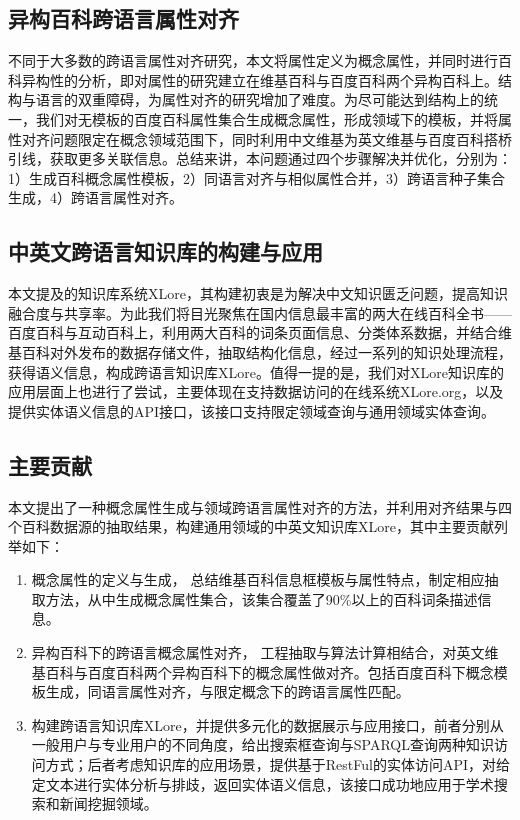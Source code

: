 
\subsection{异构百科跨语言属性对齐}
不同于大多数的跨语言属性对齐研究，本文将属性定义为概念属性，并同时进行百科异构性的分析，即对属性的研究建立在维基百科与百度百科两个异构百科上。结构与语言的双重障碍，为属性对齐的研究增加了难度。为尽可能达到结构上的统一，我们对无模板的百度百科属性集合生成概念属性，形成领域下的模板，并将属性对齐问题限定在概念领域范围下，同时利用中文维基为英文维基与百度百科搭桥引线，获取更多关联信息。总结来讲，本问题通过四个步骤解决并优化，分别为：1）生成百科概念属性模板，2）同语言对齐与相似属性合并，3）跨语言种子集合生成，4）跨语言属性对齐。


\subsection{中英文跨语言知识库的构建与应用}
本文提及的知识库系统XLore，其构建初衷是为解决中文知识匮乏问题，提高知识融合度与共享率。为此我们将目光聚焦在国内信息最丰富的两大在线百科全书——百度百科与互动百科上，利用两大百科的词条页面信息、分类体系数据，并结合维基百科对外发布的数据存储文件，抽取结构化信息，经过一系列的知识处理流程，获得语义信息，构成跨语言知识库XLore。值得一提的是，我们对XLore知识库的应用层面上也进行了尝试，主要体现在支持数据访问的在线系统XLore.org，以及提供实体语义信息的API接口，该接口支持限定领域查询与通用领域实体查询。

\subsection{主要贡献}
本文提出了一种概念属性生成与领域跨语言属性对齐的方法，并利用对齐结果与四个百科数据源的抽取结果，构建通用领域的中英文知识库XLore，其中主要贡献列举如下：
\begin{enumerate}[1)]
\item {\heiti 概念属性的定义与生成，} 总结维基百科信息框模板与属性特点，制定相应抽取方法，从中生成概念属性集合，该集合覆盖了90\%以上的百科词条描述信息。
\item {\heiti 异构百科下的跨语言概念属性对齐，} 工程抽取与算法计算相结合，对英文维基百科与百度百科两个异构百科下的概念属性做对齐。包括百度百科下概念模板生成，同语言属性对齐，与限定概念下的跨语言属性匹配。
\item {\heiti 构建跨语言知识库XLore，并提供多元化的数据展示与应用接口，}前者分别从一般用户与专业用户的不同角度，给出搜索框查询与SPARQL查询两种知识访问方式；后者考虑知识库的应用场景，提供基于RestFul的实体访问API，对给定文本进行实体分析与排歧，返回实体语义信息，该接口成功地应用于学术搜索和新闻挖掘领域。
\end{enumerate}

